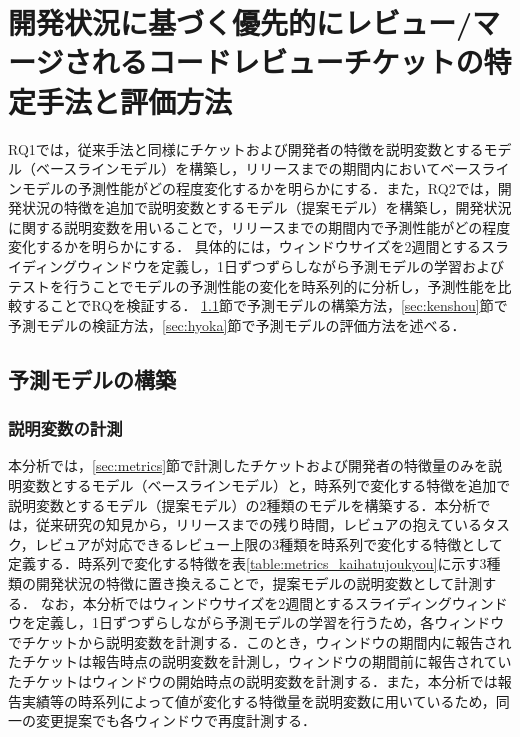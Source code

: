 \documentclass[11pt]{jreport}
\begin{document}


\chapter{開発状況に基づく優先的にレビュー/マージされるコードレビューチケットの特定手法と評価方法}\label{sec:analysis_method}

RQ1では，従来手法と同様にチケットおよび開発者の特徴を説明変数とするモデル（ベースラインモデル）を構築し，リリースまでの期間内においてベースラインモデルの予測性能がどの程度変化するかを明らかにする．また，RQ2では，開発状況の特徴を追加で説明変数とするモデル（提案モデル）を構築し，開発状況に関する説明変数を用いることで，リリースまでの期間内で予測性能がどの程度変化するかを明らかにする．
具体的には，ウィンドウサイズを2週間とするスライディングウィンドウを定義し，1日ずつずらしながら予測モデルの学習およびテストを行うことでモデルの予測性能の変化を時系列的に分析し，予測性能を比較することでRQを検証する．
\ref{sec:koutiku}節で予測モデルの構築方法，\ref{sec:kenshou}節で予測モデルの検証方法，\ref{sec:hyoka}節で予測モデルの評価方法を述べる．


\section{予測モデルの構築}\label{sec:koutiku}

\subsection{説明変数の計測}\label{sec:setumeihensuu}
本分析では，\ref{sec:metrics}節で計測したチケットおよび開発者の特徴量のみを説明変数とするモデル（ベースラインモデル）と，時系列で変化する特徴を追加で説明変数とするモデル（提案モデル）の2種類のモデルを構築する．本分析では，従来研究\cite{integrator}\cite{release_merge}の知見から，リリースまでの残り時間，レビュアの抱えているタスク，レビュアが対応できるレビュー上限の3種類を時系列で変化する特徴として定義する．時系列で変化する特徴を表\ref{table:metrics_kaihatujoukyou}に示す3種類の開発状況の特徴に置き換えることで，提案モデルの説明変数として計測する．
なお，本分析ではウィンドウサイズを2週間とするスライディングウィンドウを定義し，1日ずつずらしながら予測モデルの学習を行うため，各ウィンドウでチケットから説明変数を計測する．このとき，ウィンドウの期間内に報告されたチケットは報告時点の説明変数を計測し，ウィンドウの期間前に報告されていたチケットはウィンドウの開始時点の説明変数を計測する．また，本分析では報告実績等の時系列によって値が変化する特徴量を説明変数に用いているため，同一の変更提案でも各ウィンドウで再度計測する．
\end{document}
